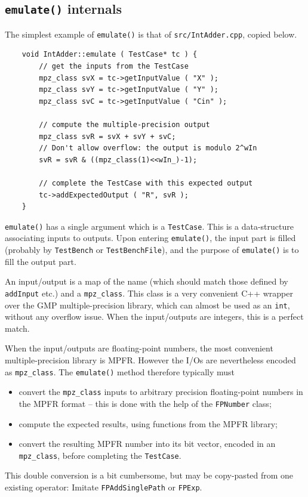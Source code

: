 \documentclass{article}
\begin{document}
\subsection{\texttt{emulate()}  internals}
The simplest example of \texttt{\small emulate()} is that of \texttt{\small src/IntAdder.cpp}, copied below.
\begin{verbatim}
	void IntAdder::emulate ( TestCase* tc ) {
		// get the inputs from the TestCase
		mpz_class svX = tc->getInputValue ( "X" );
		mpz_class svY = tc->getInputValue ( "Y" );
		mpz_class svC = tc->getInputValue ( "Cin" );
		
		// compute the multiple-precision output
		mpz_class svR = svX + svY + svC;
		// Don't allow overflow: the output is modulo 2^wIn
		svR = svR & ((mpz_class(1)<<wIn_)-1);
		
		// complete the TestCase with this expected output
		tc->addExpectedOutput ( "R", svR );
	}
\end{verbatim}

\texttt{\small emulate()} has a single argument which is a
\texttt{\small TestCase}. This is a data-structure associating inputs to
outputs. Upon entering \texttt{\small emulate()}, the input part is filled
(probably by \texttt{\small TestBench} or \texttt{\small TestBenchFile}), and the
purpose of \texttt{\small emulate()} is to fill the output part.

An input/output is a map of the name (which should match those defined by \texttt{\small addInput} etc.) and a \texttt{\small mpz\_class}. This class is a very convenient C++ wrapper over the GMP multiple-precision library, which can almost be used as an \texttt{\small int}, without any overflow issue. When the input/outputs are integers, this is a perfect match.

When the input/outputs are floating-point numbers, the most convenient multiple-precision library is MPFR. However the I/Os  are nevertheless encoded as \texttt{\small mpz\_class}. The \texttt{\small emulate()} method therefore typically must
\begin{itemize}
\item convert the \texttt{\small mpz\_class} inputs to arbitrary precision floating-point numbers in the MPFR format -- this is done with the help of the \texttt{\small FPNumber} class;
\item compute the expected results, using functions from the MPFR library;
\item convert the resulting MPFR number into its bit vector, encoded in an \texttt{\small mpz\_class}, before completing the \texttt{\small TestCase}. 
\end{itemize}
This double conversion is a bit cumbersome, but may be copy-pasted from one existing operator: Imitate \texttt{\small FPAddSinglePath} or \texttt{\small FPExp}.
\end{document}
